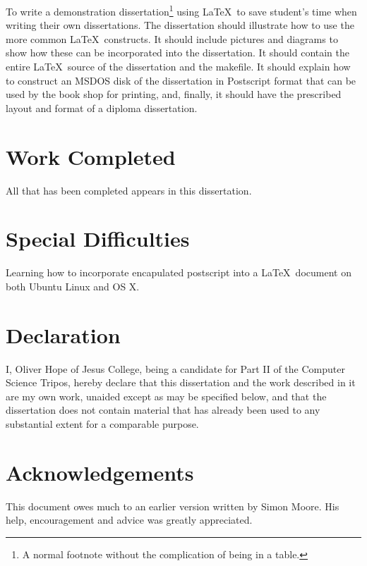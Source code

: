 \documentclass[12pt,a4paper,twoside,openright]{report}
\begin{document}
To write a demonstration dissertation\footnote{A normal footnote without the
complication of being in a table.} using \LaTeX\ to save
student's time when writing their own dissertations. The dissertation
should illustrate how to use the more common \LaTeX\ constructs. It
should include pictures and diagrams to show how these can be
incorporated into the dissertation.  It should contain the entire
\LaTeX\ source of the dissertation and the makefile.  It should
explain how to construct an MSDOS disk of the dissertation in
Postscript format that can be used by the book shop for printing, and,
finally, it should have the prescribed layout and format of a diploma
dissertation.


\section*{Work Completed}

All that has been completed appears in this dissertation.

\section*{Special Difficulties}

Learning how to incorporate encapulated postscript into a \LaTeX\
document on both Ubuntu Linux and OS X.
 
\newpage
\section*{Declaration}

I, Oliver Hope of Jesus College, being a candidate for Part II of the Computer
Science Tripos, hereby declare
that this dissertation and the work described in it are my own work,
unaided except as may be specified below, and that the dissertation
does not contain material that has already been used to any substantial
extent for a comparable purpose.

\bigskip
{}

\medskip
{}

\tableofcontents

\listoffigures

\newpage
\section*{Acknowledgements}

This document owes much to an earlier version written by Simon Moore.  His help, encouragement and advice was greatly 
appreciated.
\end{document}
